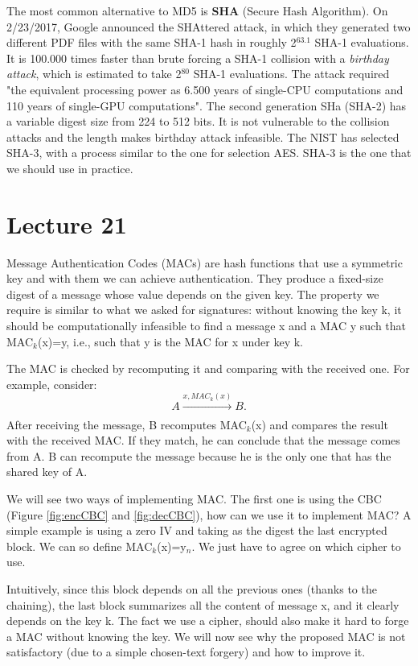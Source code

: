 \documentclass[a4paper, 12pt]{report}
\begin{document}
The most common alternative to MD5 is \textbf{SHA} (Secure Hash Algorithm). On 2/23/2017, Google announced the SHAttered attack, in which they generated two different PDF files with the same SHA-1 hash in roughly 2$^{63.1}$ SHA-1 evaluations. It is 100.000 times faster than brute forcing a SHA-1 collision with a \textit{birthday attack}, which is estimated to take 2$^{80}$ SHA-1 evaluations. The attack required "the equivalent processing power as 6.500 years of single-CPU computations and 110 years of single-GPU computations". The second generation SHa (SHA-2) has a variable digest size from 224 to 512 bits. It is not vulnerable to the collision attacks and the length makes birthday attack infeasible. The NIST has selected SHA-3, with a process similar to the one for selection AES. SHA-3 is the one that we should use in practice.

\chapter*{Lecture 21}
Message Authentication Codes (MACs) are hash functions that use a symmetric key and with them we can achieve authentication. They produce a fixed-size digest of a message whose value depends on the given key. The property we require is similar to what we asked for signatures: without knowing the key k, it should be computationally infeasible to find a message x and a MAC y such that MAC$_k$(x)=y, i.e., such that y is the MAC for x under key k.

The MAC is checked by recomputing it and comparing with the received one. For example, consider:
\[A\xrightarrow[]{x,MAC_k(x)}B.\]
After receiving the message, B recomputes MAC$_k$(x) and compares the result with the received MAC. If they match, he can conclude that the message comes from A. B can recompute the message because he is the only one that has the shared key of A.

We will see two ways of implementing MAC. The first one is using the CBC (Figure \ref{fig:encCBC} and \ref{fig:decCBC}), how can we use it to implement MAC? A simple example is using a zero IV and taking as the digest the last encrypted block. We can so define MAC$_k$(x)=y$_n$. We just have to agree on which cipher to use.

Intuitively, since this block depends on all the previous ones (thanks to the chaining), the last block summarizes all the content of message x, and it clearly depends on the key k. The fact we use a cipher, should also make it hard to forge a MAC without knowing the key. We will now see why the proposed MAC is not satisfactory (due to a simple chosen-text forgery) and how to improve it.
\end{document}
